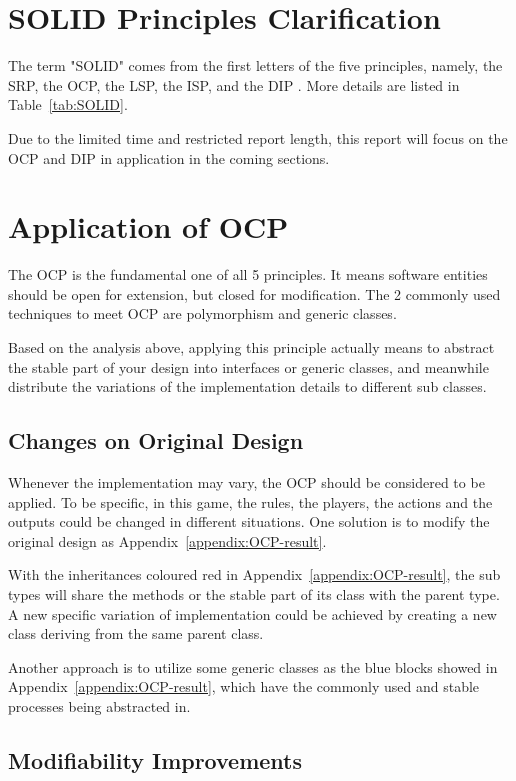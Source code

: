 \documentclass[conference]{IEEEtran}
\begin{document}
\section{SOLID Principles Clarification}

The term "SOLID" comes from the first letters of the five principles, namely, the \gls{SRP}, the \gls{OCP}, the \gls{LSP}, the \gls{ISP}, and the \gls{DIP} \cite{1}. More details are listed in Table~\ref{tab:SOLID}.

Due to the limited time and restricted report length, this report will focus on the \gls{OCP} and \gls{DIP} in application in the coming sections. 

\section{Application of \gls{OCP}}
The \gls{OCP} is the fundamental one of all 5 principles. It means software entities should be open for extension, but closed for modification.\cite{1} The 2 commonly used techniques to meet \gls{OCP} are polymorphism and generic classes.\cite{1}

Based on the analysis above, applying this principle actually means to abstract the stable part of your design into interfaces or generic classes, and meanwhile distribute the variations of the implementation details to different sub classes.

\subsection{Changes on Original Design}
Whenever the implementation may vary, the \gls{OCP} should be considered to be applied. To be specific, in this game, the rules, the players, the actions and the outputs could be changed in  different situations. One solution is to modify the original design as Appendix~\ref{appendix:OCP-result}.

With the inheritances coloured red in Appendix~\ref{appendix:OCP-result}, the sub types will share the methods or the stable part of its class with the parent type. A new specific variation of implementation could be achieved by creating a new class deriving from the same parent class.

Another approach is to utilize some generic classes as the blue blocks showed in Appendix~\ref{appendix:OCP-result}, which have the commonly used and stable processes being abstracted in. 

\subsection{Modifiability Improvements}
\end{document}
